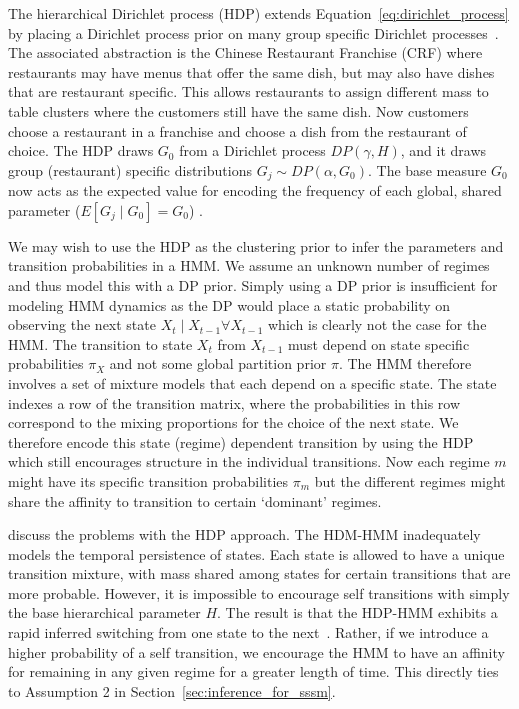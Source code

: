 The hierarchical Dirichlet process (HDP) extends Equation~\ref{eq:dirichlet_process} by placing a Dirichlet process prior on many group specific Dirichlet processes~\citep{teh2005sharing}. The associated abstraction is the Chinese Restaurant Franchise (CRF) where restaurants may have menus that offer the same dish, but may also have dishes that are restaurant specific. This allows restaurants to assign different mass to table clusters where the customers still have the same dish. Now customers choose a restaurant in a franchise and choose a dish from the restaurant of choice. The HDP draws $G_0$ from a Dirichlet process $DP(\gamma, H)$, and it draws group (restaurant) specific distributions $G_j \sim DP(\alpha, G_0)$. The base measure $G_0$ now acts as the expected value for encoding the frequency of each global, shared parameter ($E[G_j \mid G_0] = G_0$) \citep{fox2007hierarchical}.

We may wish to use the HDP as the clustering prior to infer the parameters and transition probabilities in a HMM. We assume an unknown number of regimes and thus model this with a DP prior. Simply using a DP prior is insufficient for modeling HMM dynamics as the DP would place a static probability on observing the next state $X_t \mid X_{t-1} \forall X_{t-1}$ which is clearly not the case for the HMM. The transition to state $X_t$ from $X_{t-1}$ must depend on state specific probabilities $\pi_X$ and not some global partition prior $\pi$. The HMM therefore involves a set of mixture models that each depend on a specific state. The state indexes a row of the transition matrix, where the probabilities in this row correspond to the mixing proportions for the choice of the next state. We therefore encode this state (regime) dependent transition by using the HDP which still encourages structure in the individual transitions. Now each regime $m$ might have its specific transition probabilities $\pi_m$ but the different regimes might share the affinity to transition to certain `dominant' regimes.

\cite{fox2009nonparametric, fox2007hierarchical} discuss the problems with the HDP approach. The HDM-HMM inadequately models the temporal persistence of states. Each state is allowed to have a unique transition mixture, with mass shared among states for certain transitions that are more probable. However, it is impossible to encourage self transitions with simply the base hierarchical parameter $H$. The result is that the HDP-HMM exhibits a rapid inferred switching from one state to the next~\citep{fox2007hierarchical}. Rather, if we introduce a higher probability of a self transition, we encourage the HMM to have an affinity for remaining in any given regime for a greater length of time. This directly ties to Assumption 2 in Section~\ref{sec:inference_for_sssm}.

